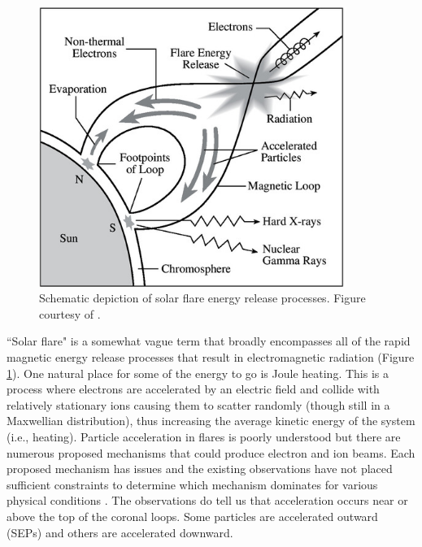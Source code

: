 \begin{figure}[!h]
    \begin{center}
	    \includegraphics[width=100mm]{Images/SolarFlareSchematic.png}
    \end{center}
    \caption[Solar Flare Schematic]{
        Schematic depiction of solar flare energy release processes. Figure courtesy of \citet{Lang2001}.
    }
    \label{fig:solarflareschematic}
\end{figure}

``Solar flare" is a somewhat vague term that broadly encompasses all of the rapid magnetic energy release processes that result in electromagnetic radiation (Figure \ref{fig:solarflareschematic}). One natural place for some of the energy to go is Joule heating. This is a process where electrons are accelerated by an electric field and collide with relatively stationary ions causing them to scatter randomly (though still in a Maxwellian distribution), thus increasing the average kinetic energy of the system (i.e., heating). Particle acceleration in flares is poorly understood but there are numerous proposed mechanisms that could produce electron and ion beams. Each proposed mechanism has issues and the existing observations have not placed sufficient constraints to determine which mechanism dominates for various physical conditions \citep{Kontar2011, Zharkova2011}. The observations do tell us that acceleration occurs near or above the top of the coronal loops. Some particles are accelerated outward (SEPs) and others are accelerated downward. 

